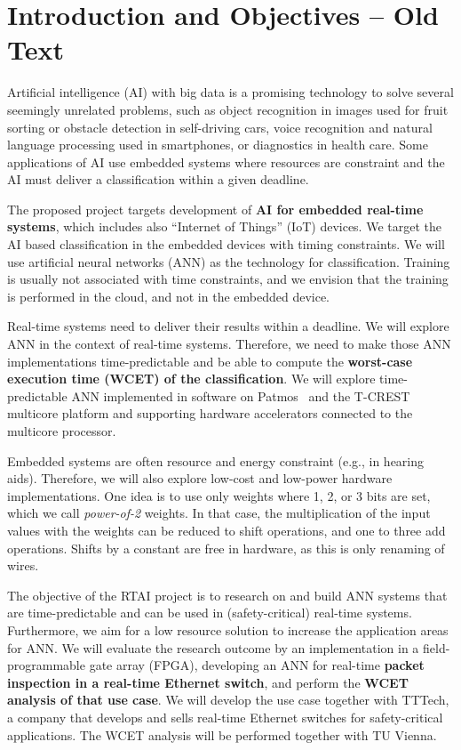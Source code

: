 \documentclass[fleqn,12pt]{article}
\begin{document}
\section{Introduction and Objectives -- Old Text}
\label{sec:objectives}

Artificial intelligence (AI) with big data is a promising technology to solve several
seemingly unrelated problems, such as object recognition in images used for
fruit sorting or obstacle detection in self-driving cars, voice recognition and
natural language processing used in smartphones, or diagnostics in health care.
Some applications of AI use embedded systems where resources are
constraint and the AI must deliver a classification within a given deadline.

The proposed project targets development of {\bf AI for embedded real-time systems},
which includes also ``Internet of Things'' (IoT) devices.
We target the AI based classification in the embedded devices with timing constraints.
We will use artificial neural networks (ANN) as the technology for classification.
Training is usually not associated with time constraints, and we envision that
the training is performed in the cloud, and not in the embedded device.

Real-time systems need to deliver their results within a deadline. We will explore ANN
in the context of real-time systems. Therefore, we need to make those ANN implementations
time-predictable and be able to compute the {\bf worst-case execution time
(WCET) of the classification}.
We will explore time-predictable ANN implemented
in software on Patmos~\cite{patmos:rts2018} and the T-CREST~\cite{t-crest:2015}
multicore platform and supporting hardware accelerators connected to the
multicore processor.

Embedded systems are often resource and energy constraint (e.g., in hearing aids).
Therefore, we will also explore low-cost and low-power hardware implementations.
One idea is to use only weights where 1, 2, or 3 bits are set, which we call
\emph{power-of-2} weights. In that case, the multiplication of the input values with the weights
can be reduced to shift operations, and one to three add operations. Shifts by a constant
are free in hardware, as this is only renaming of wires.

The objective of the RTAI project is to research on and build ANN systems that
are time-predictable and can be used in (safety-critical) real-time systems.
Furthermore, we aim for a low resource solution to increase the application
areas for ANN.
We will evaluate the research outcome by an implementation in a field-programmable
gate array (FPGA), developing an ANN for real-time {\bf packet inspection in a real-time
Ethernet switch}, and perform the {\bf WCET analysis of that use case}.
We will develop the use case together with TTTech, a company that develops and sells
real-time Ethernet switches for safety-critical applications. The WCET analysis
will be performed together with TU Vienna.
\end{document}
